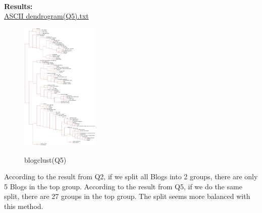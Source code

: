 \documentclass{article}
\begin{document}
		\noindent\\\textbf{Results:}\\
		\indent\href{https://github.com/zhangboroy/cs532-s17/blob/master/assg08_submission/ASCII%20dendrogram(Q5).txt}{ASCII dendrogram(Q5).txt}\\
		\begin{figure}[!htb]
			\centering 
			\href{https://github.com/zhangboroy/cs532-s17/blob/master/assg08_submission/blogclust(Q5).jpg}
			{\includegraphics[width=0.33\textwidth]{blogclust(Q5).jpg}}
			\label{fig:blogclust(Q5)}
			\caption{blogclust(Q5)}
		\end{figure}

		According to the result from Q2, if we split all Blogs into 2 groups, there are only 5 Blogs in the top group. According to the result from Q5, if we do the same split, there are 27 groups in the top group. The split seems more balanced with this method.\\
	
\end{document}
